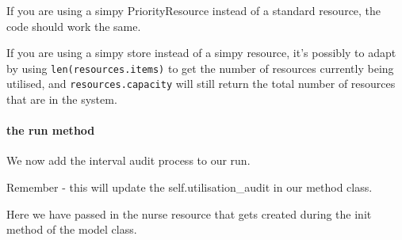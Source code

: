 \documentclass[
  letterpaper,
  DIV=11,
  numbers=noendperiod]{scrreprt}
\let\oldparagraph\paragraph
\renewcommand{\paragraph}[1]{\oldparagraph{#1}\mbox{}}
\begin{document}
\begin{tcolorbox}[enhanced jigsaw, colframe=quarto-callout-tip-color-frame, bottomtitle=1mm, breakable, rightrule=.15mm, coltitle=black, colbacktitle=quarto-callout-tip-color!10!white, opacityback=0, leftrule=.75mm, arc=.35mm, toptitle=1mm, title=\textcolor{quarto-callout-tip-color}{\faLightbulb}\hspace{0.5em}{Tip}, titlerule=0mm, colback=white, toprule=.15mm, bottomrule=.15mm, left=2mm, opacitybacktitle=0.6]

If you are using a simpy PriorityResource instead of a standard
resource, the code should work the same.

If you are using a simpy store instead of a simpy resource, it's
possibly to adapt by using \texttt{len(resources.items)} to get the
number of resources currently being utilised, and
\texttt{resources.capacity} will still return the total number of
resources that are in the system.

\end{tcolorbox}

\paragraph{the run method}\label{the-run-method-6}

We now add the interval audit process to our run.

Remember - this will update the self.utilisation\_audit in our method
class.

Here we have passed in the nurse resource that gets created during the
init method of the model class.
\end{document}
